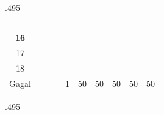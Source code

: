 \begin{table}
\begin{subtable}{.495\linewidth}
{\begin{tabular}{|c|lllllllll|}
			16                                                                             & \multicolumn{1}{r|}{}   & \multicolumn{1}{r|}{}   & \multicolumn{1}{r|}{}   & \multicolumn{1}{r|}{}   & \multicolumn{1}{r|}{}   & \multicolumn{1}{r|}{}   & \multicolumn{1}{r|}{}   & \multicolumn{1}{r|}{}   &                         \\ \hline
			17                                                                             & \multicolumn{1}{r|}{}   & \multicolumn{1}{r|}{}   & \multicolumn{1}{r|}{}   & \multicolumn{1}{r|}{}   & \multicolumn{1}{r|}{}   & \multicolumn{1}{r|}{}   & \multicolumn{1}{r|}{}   & \multicolumn{1}{r|}{}   &                         \\ \hline
			18                                                                             & \multicolumn{1}{r|}{}   & \multicolumn{1}{r|}{}   & \multicolumn{1}{r|}{}   & \multicolumn{1}{r|}{}   & \multicolumn{1}{r|}{}   & \multicolumn{1}{r|}{}   & \multicolumn{1}{r|}{}   & \multicolumn{1}{r|}{}   &                         \\ \hline
			Gagal                                                                          & \multicolumn{1}{r|}{}   & \multicolumn{1}{r|}{}   & \multicolumn{1}{r|}{}   & \multicolumn{1}{r|}{1}  & \multicolumn{1}{r|}{50} & \multicolumn{1}{r|}{50} & \multicolumn{1}{r|}{50} & \multicolumn{1}{r|}{50} & 50                      \\ \hline
			\end{tabular}
		}
	\end{subtable}
	\begin{subtable}{.495\linewidth}
		\centering
		\caption{}
\end{subtable}
\end{table}
